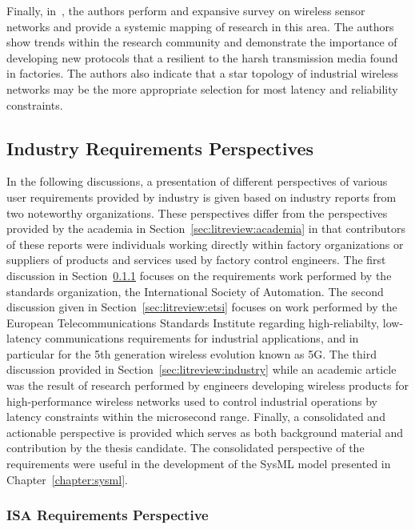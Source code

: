 Finally, in~\cite{QUEIROZ201796}, the authors perform and expansive survey on wireless sensor networks and provide a systemic mapping of research in this area.  The authors show trends within the research community and demonstrate the importance of developing new protocols that a resilient to the harsh transmission media found in factories.  The authors also indicate that a star topology of industrial wireless networks may be the more appropriate selection for most latency and reliability constraints.


\subsection{Industry Requirements Perspectives}

In the following discussions, a presentation of different perspectives of various user requirements provided by industry is given based on industry reports from two noteworthy organizations.  These perspectives differ from the perspectives provided by the academia in Section~\ref{sec:litreview:academia} in that contributors of these reports were individuals working directly within factory organizations or suppliers of products and services used by factory control engineers.  The first discussion in Section~\ref{sec:litreview:isa} focuses on the requirements work performed by the standards organization, the International Society of Automation.  The second discussion given in Section~\ref{sec:litreview:etsi} focuses on work performed by the European Telecommunications Standards Institute regarding high-reliabilty, low-latency communications requirements for industrial applications, and in particular for the 5th generation wireless evolution known as 5G.  The third discussion provided in Section~\ref{sec:litreview:industry} while an academic article was the result of research performed by engineers developing wireless products for high-performance wireless networks used to control industrial operations by latency constraints within the microsecond range.  Finally, a consolidated and actionable perspective is provided which serves as both background material and contribution by the thesis candidate.  The consolidated perspective of the requirements were useful in the development of the SysML model presented in Chapter~\ref{chapter:sysml}.

\subsubsection{ISA Requirements Perspective}\label{sec:litreview:isa}

